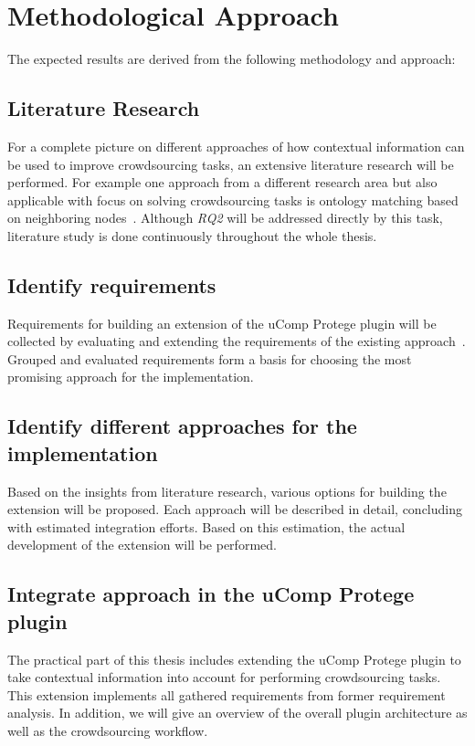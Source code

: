 \documentclass[12pt, notitlepage]{article}
\begin{document}
\section{Methodological Approach}


The expected results are derived from the following methodology and approach:
\subsection{Literature Research}
For a complete picture on different approaches of how contextual information can be used to improve crowdsourcing tasks, an extensive literature research will be performed. For example one approach from a different research area but also applicable with focus on solving crowdsourcing tasks is ontology matching based on neighboring nodes~\cite{hoffmann2010context}. Although \emph{RQ2} will be addressed directly by this task, literature study is done continuously throughout the whole thesis. 
\subsection{Identify requirements}
Requirements for building an extension of the uComp Protege plugin will be collected by evaluating and extending the requirements of the existing approach~\cite{wohlgenannt2016crowd}. Grouped and evaluated requirements form a basis for choosing the most promising approach for the implementation.
\subsection{Identify different approaches for the implementation}
Based on the insights from literature research, various options for building the extension will be proposed. Each approach will be described in detail, concluding with estimated integration efforts. Based on this estimation, the actual development of the extension will be performed. 
\subsection{Integrate approach in the uComp Protege plugin}
The practical part of this thesis includes extending the uComp Protege plugin to take contextual information into account for performing crowdsourcing tasks. This extension implements all gathered requirements from former requirement analysis. In addition, we will give an overview of the overall plugin architecture as well as the crowdsourcing workflow. 
\end{document}
